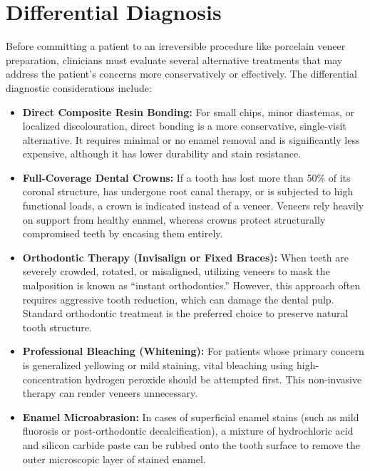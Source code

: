 \section*{Differential Diagnosis}
Before committing a patient to an irreversible procedure like porcelain veneer preparation, clinicians must evaluate several alternative treatments that may address the patient's concerns more conservatively or effectively. The differential diagnostic considerations include:
\begin{itemize}
    \item \textbf{Direct Composite Resin Bonding:} For small chips, minor diastemas, or localized discolouration, direct bonding is a more conservative, single-visit alternative. It requires minimal or no enamel removal and is significantly less expensive, although it has lower durability and stain resistance.
    \item \textbf{Full-Coverage Dental Crowns:} If a tooth has lost more than 50\% of its coronal structure, has undergone root canal therapy, or is subjected to high functional loads, a crown is indicated instead of a veneer. Veneers rely heavily on support from healthy enamel, whereas crowns protect structurally compromised teeth by encasing them entirely.
    \item \textbf{Orthodontic Therapy (Invisalign or Fixed Braces):} When teeth are severely crowded, rotated, or misaligned, utilizing veneers to mask the malposition is known as ``instant orthodontics.'' However, this approach often requires aggressive tooth reduction, which can damage the dental pulp. Standard orthodontic treatment is the preferred choice to preserve natural tooth structure.
    \item \textbf{Professional Bleaching (Whitening):} For patients whose primary concern is generalized yellowing or mild staining, vital bleaching using high-concentration hydrogen peroxide should be attempted first. This non-invasive therapy can render veneers unnecessary.
    \item \textbf{Enamel Microabrasion:} In cases of superficial enamel stains (such as mild fluorosis or post-orthodontic decalcification), a mixture of hydrochloric acid and silicon carbide paste can be rubbed onto the tooth surface to remove the outer microscopic layer of stained enamel.
\end{itemize}

